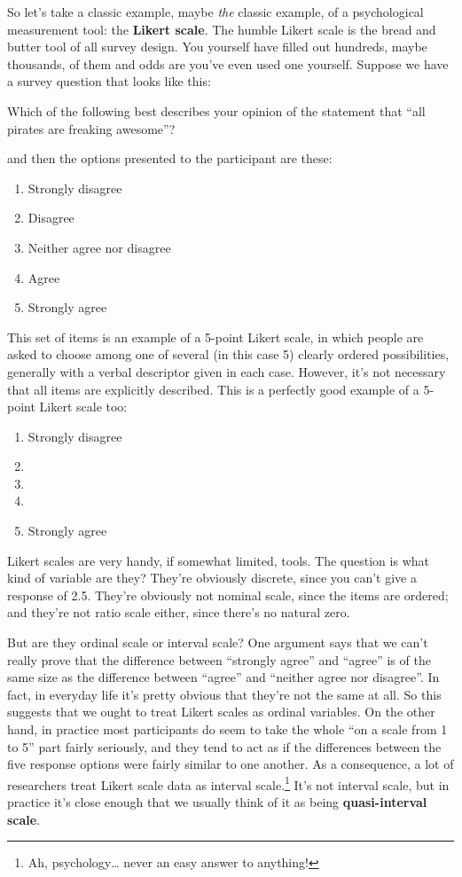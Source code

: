 \documentclass[
]{book}
\providecommand{\tightlist}{%
  \setlength{\itemsep}{0pt}\setlength{\parskip}{0pt}}
\begin{document}
So let's take a classic example, maybe \emph{the} classic example, of a psychological measurement tool: the \textbf{Likert scale}. The humble Likert scale is the bread and butter tool of all survey design. You yourself have filled out hundreds, maybe thousands, of them and odds are you've even used one yourself. Suppose we have a survey question that looks like this:

Which of the following best describes your opinion of the statement that ``all pirates are freaking awesome''?

and then the options presented to the participant are these:

\begin{enumerate}
\def\labelenumi{\arabic{enumi}.}
\tightlist
\item
  Strongly disagree
\item
  Disagree
\item
  Neither agree nor disagree
\item
  Agree
\item
  Strongly agree
\end{enumerate}

This set of items is an example of a 5-point Likert scale, in which people are asked to choose among one of several (in this case 5) clearly ordered possibilities, generally with a verbal descriptor given in each case. However, it's not necessary that all items are explicitly described. This is a perfectly good example of a 5-point Likert scale too:

\begin{enumerate}
\def\labelenumi{\arabic{enumi}.}
\tightlist
\item
  Strongly disagree
\item
\item
\item
\item
  Strongly agree
\end{enumerate}

Likert scales are very handy, if somewhat limited, tools. The question is what kind of variable are they? They're obviously discrete, since you can't give a response of 2.5. They're obviously not nominal scale, since the items are ordered; and they're not ratio scale either, since there's no natural zero.

But are they ordinal scale or interval scale? One argument says that we can't really prove that the difference between ``strongly agree'' and ``agree'' is of the same size as the difference between ``agree'' and ``neither agree nor disagree''. In fact, in everyday life it's pretty obvious that they're not the same at all. So this suggests that we ought to treat Likert scales as ordinal variables. On the other hand, in practice most participants do seem to take the whole ``on a scale from 1 to 5'' part fairly seriously, and they tend to act as if the differences between the five response options were fairly similar to one another. As a consequence, a lot of researchers treat Likert scale data as interval scale.\footnote{Ah, psychology\ldots{} never an easy answer to anything!} It's not interval scale, but in practice it's close enough that we usually think of it as being \textbf{quasi-interval scale}.
\end{document}
